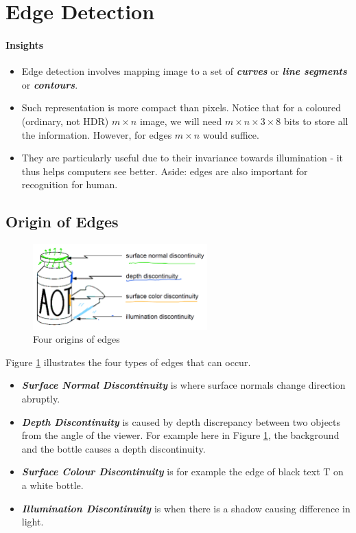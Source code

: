 \documentclass[11pt]{article}
\begin{document}
\section{Edge Detection}
\paragraph{Insights}
\begin{itemize}
	\item Edge detection involves mapping image to a set of \textit{\textbf{curves}} or \textit{\textbf{line segments}} or \textit{\textbf{contours}}.
	\item Such representation is more compact than pixels. Notice that for a coloured (ordinary, not HDR) $m \times n$ image, we will need $m \times n \times 3 \times 8$ bits to store all the information. However, for edges $m \times n$ would suffice. 
	\item They are particularly useful due to their invariance towards illumination - it thus helps computers see better. Aside: edges are also important for recognition for human. 
\end{itemize}

\subsection{Origin of Edges}
\begin{figure}[H]
\center\includegraphics[width=0.6\textwidth]{figs/edge_types.png}
\caption{Four origins of edges \label{fig:edge_types}}
\end{figure}
Figure \ref{fig:edge_types} illustrates the four types of edges that can occur. 
\begin{itemize}
\item \textit{\textbf{Surface Normal Discontinuity}} is where surface normals change direction abruptly. 
\item \textit{\textbf{Depth Discontinuity}} is caused by depth discrepancy between two objects from the angle of the viewer. For example here in Figure \ref{fig:edge_types}, the background and the bottle causes a depth discontinuity. 
\item \textit{\textbf{Surface Colour Discontinuity}} is for example the edge of black text T on a white bottle. 
\item \textit{\textbf{Illumination Discontinuity}} is when there is a shadow causing difference in light. 
\end{itemize}
\end{document}

